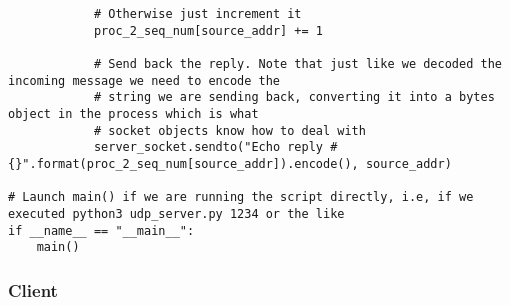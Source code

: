 \documentclass[landscape]{article}
\begin{document}
\begin{verbatim}
            # Otherwise just increment it
            proc_2_seq_num[source_addr] += 1

            # Send back the reply. Note that just like we decoded the incoming message we need to encode the
            # string we are sending back, converting it into a bytes object in the process which is what
            # socket objects know how to deal with
            server_socket.sendto("Echo reply # {}".format(proc_2_seq_num[source_addr]).encode(), source_addr)

# Launch main() if we are running the script directly, i.e, if we executed python3 udp_server.py 1234 or the like
if __name__ == "__main__":
    main()
                \end{verbatim}

            \subsubsection{Client}
\end{document}
